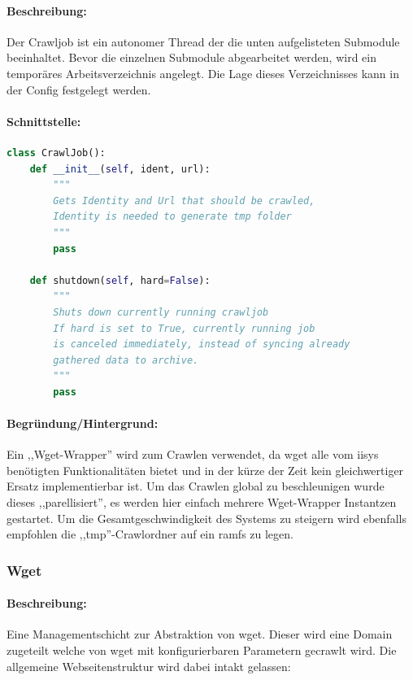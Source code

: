 
\paragraph{Beschreibung:}
\label{par:beschreibung_}
Der Crawljob ist ein autonomer Thread der die unten aufgelisteten Submodule beeinhaltet.
Bevor die einzelnen Submodule abgearbeitet werden, wird ein temporäres Arbeitsverzeichnis angelegt.
Die Lage dieses Verzeichnisses kann in der Config festgelegt werden.
\paragraph{Schnittstelle:}
\label{par:api_}

\begin{lstlisting}[language=python]
class CrawlJob():
    def __init__(self, ident, url):
        """
        Gets Identity and Url that should be crawled,
        Identity is needed to generate tmp folder
        """
        pass

    def shutdown(self, hard=False): 
        """
        Shuts down currently running crawljob
        If hard is set to True, currently running job
        is canceled immediately, instead of syncing already
        gathered data to archive.
        """
        pass
\end{lstlisting}
\paragraph{Begründung/Hintergrund:}
\label{par:begr_ndung_hintergrund_}
Ein ,,Wget-Wrapper'' wird zum Crawlen verwendet, da wget alle vom iisys benötigten Funktionalitäten bietet und
in der kürze der Zeit kein gleichwertiger Ersatz implementierbar ist. Um das Crawlen global zu 
beschleunigen wurde dieses ,,parellisiert'', es werden hier einfach mehrere Wget-Wrapper Instantzen gestartet.
Um die Gesamtgeschwindigkeit des Systems zu steigern wird ebenfalls empfohlen die ,,tmp''-Crawlordner auf ein
ramfs zu legen.

\subsubsection{Wget}
\label{ssub:wget}
\paragraph{Beschreibung:}
\label{par:beschreibung_}
Eine Managementschicht zur Abstraktion von wget.
Dieser wird eine Domain zugeteilt welche von wget mit konfigurierbaren Parametern gecrawlt wird.
Die allgemeine Webseitenstruktur wird dabei intakt gelassen:

